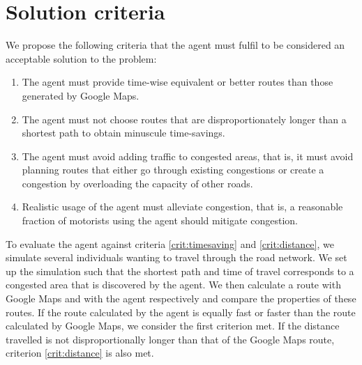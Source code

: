 \section{Solution criteria}
We propose the following criteria that the agent must fulfil to be considered an acceptable solution to the problem:

\begin{enumerate}
\item The agent must provide time-wise equivalent or better routes than those generated by Google Maps.\label{crit:timesaving}
\item The agent must not choose routes that are disproportionately longer than a shortest path to obtain minuscule time-savings.\label{crit:distance}
\item The agent must avoid adding traffic to congested areas, that is, it must avoid planning routes that either go through existing congestions or create a congestion by overloading the capacity of other roads. \label{crit:overload}
\item Realistic usage of the agent must alleviate congestion, that is, a reasonable fraction of motorists using the agent should mitigate congestion.\label{crit:congestion}
\end{enumerate}

To evaluate the agent against criteria \ref{crit:timesaving} and \ref{crit:distance}, we simulate several individuals wanting to travel through the road network. We set up the simulation such that the shortest path and time of travel corresponds to a congested area that is discovered by the agent. We then calculate a route with Google Maps and with the agent respectively and compare the properties of these routes. If the route calculated by the agent is equally fast or faster than the route calculated by Google Maps, we consider the first criterion met. If the distance travelled is not disproportionally longer than that of the Google Maps route, criterion \ref{crit:distance} is also met.

